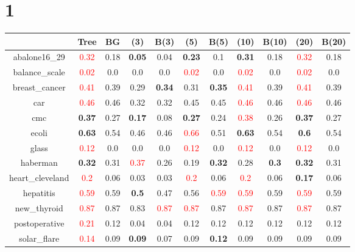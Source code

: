 \documentclass{article}%
\begin{document}
\section*{1}%
\begin{tabular}{c|cccccccccc}%
\hline%
&Tree&BG&(3)&B(3)&(5)&B(5)&(10)&B(10)&(20)&B(20)\\%
\hline%
abalone16\_29&\textcolor{red}{ 
0.32
}&0.18&\textbf{0.05}&0.04&\textbf{0.23}&0.1&\textbf{0.31}&0.18&\textcolor{red}{ 
0.32
}&0.18\\%
\hline%
balance\_scale&\textcolor{red}{ 
0.02
}&0.0&0.0&0.0&\textcolor{red}{ 
0.02
}&0.0&\textcolor{red}{ 
0.02
}&0.0&\textcolor{red}{ 
0.02
}&0.0\\%
\hline%
breast\_cancer&\textcolor{red}{ 
0.41
}&0.39&0.29&\textbf{0.34}&0.31&\textbf{0.35}&\textcolor{red}{ 
0.41
}&0.39&\textcolor{red}{ 
0.41
}&0.39\\%
\hline%
car&\textcolor{red}{ 
0.46
}&0.46&0.32&0.32&0.45&0.45&\textcolor{red}{ 
0.46
}&0.46&\textcolor{red}{ 
0.46
}&0.46\\%
\hline%
cmc&\textbf{0.37}&0.27&\textbf{0.17}&0.08&\textbf{0.27}&0.24&\textcolor{red}{ 
0.38
}&0.26&\textbf{0.37}&0.27\\%
\hline%
ecoli&\textbf{0.63}&0.54&0.46&0.46&\textcolor{red}{ 
0.66
}&0.51&\textbf{0.63}&0.54&\textbf{0.6}&0.54\\%
\hline%
glass&\textcolor{red}{ 
0.12
}&0.0&0.0&0.0&\textcolor{red}{ 
0.12
}&0.0&\textcolor{red}{ 
0.12
}&0.0&\textcolor{red}{ 
0.12
}&0.0\\%
\hline%
haberman&\textbf{0.32}&0.31&\textcolor{red}{ 
0.37
}&0.26&0.19&\textbf{0.32}&0.28&\textbf{0.3}&\textbf{0.32}&0.31\\%
\hline%
heart\_cleveland&\textcolor{red}{ 
0.2
}&0.06&0.03&0.03&\textcolor{red}{ 
0.2
}&0.06&\textcolor{red}{ 
0.2
}&0.06&\textbf{0.17}&0.06\\%
\hline%
hepatitis&\textcolor{red}{ 
0.59
}&0.59&\textbf{0.5}&0.47&0.56&\textcolor{red}{ 
0.59
}&\textcolor{red}{ 
0.59
}&0.59&\textcolor{red}{ 
0.59
}&0.59\\%
\hline%
new\_thyroid&\textcolor{red}{ 
0.87
}&0.87&0.83&\textcolor{red}{ 
0.87
}&\textcolor{red}{ 
0.87
}&0.87&\textcolor{red}{ 
0.87
}&0.87&\textcolor{red}{ 
0.87
}&0.87\\%
\hline%
postoperative&\textcolor{red}{ 
0.21
}&0.12&0.04&0.04&0.12&0.12&0.12&0.12&0.12&0.12\\%
\hline%
solar\_flare&\textcolor{red}{ 
0.14
}&0.09&\textbf{0.09}&0.07&0.09&\textbf{0.12}&0.09&0.09&0.09&0.09\\%

\end{tabular}
\end{document}
